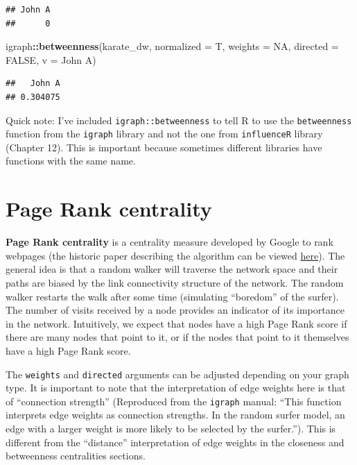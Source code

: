 \documentclass[
]{book}
\newenvironment{Shaded}{\begin{snugshade}}{\end{snugshade}}
\newcommand{\AttributeTok}[1]{\textcolor[rgb]{0.13,0.29,0.53}{#1}}
\newcommand{\ConstantTok}[1]{\textcolor[rgb]{0.56,0.35,0.01}{#1}}
\newcommand{\FunctionTok}[1]{\textcolor[rgb]{0.13,0.29,0.53}{\textbf{#1}}}
\newcommand{\NormalTok}[1]{#1}
\newcommand{\SpecialCharTok}[1]{\textcolor[rgb]{0.81,0.36,0.00}{\textbf{#1}}}
\newcommand{\StringTok}[1]{\textcolor[rgb]{0.31,0.60,0.02}{#1}}
\begin{document}
\begin{verbatim}
## John A 
##      0
\end{verbatim}

\begin{Shaded}
\begin{Highlighting}[]
\NormalTok{igraph}\SpecialCharTok{::}\FunctionTok{betweenness}\NormalTok{(karate\_dw, }\AttributeTok{normalized =}\NormalTok{ T, }\AttributeTok{weights =} \ConstantTok{NA}\NormalTok{, }\AttributeTok{directed =} \ConstantTok{FALSE}\NormalTok{, }\AttributeTok{v =} \StringTok{\textquotesingle{}John A\textquotesingle{}}\NormalTok{)}
\end{Highlighting}
\end{Shaded}

\begin{verbatim}
##   John A 
## 0.304075
\end{verbatim}

Quick note: I've included \texttt{igraph::betweenness} to tell R to use the \texttt{betweenness} function from the \texttt{igraph} library and not the one from \texttt{influenceR} library (Chapter 12). This is important because sometimes different libraries have functions with the same name.

\section{Page Rank centrality}\label{page-rank-centrality}

\textbf{Page Rank centrality} is a centrality measure developed by Google to rank webpages (the historic paper describing the algorithm can be viewed \href{http://infolab.stanford.edu/~backrub/google.html}{here}). The general idea is that a random walker will traverse the network space and their paths are biased by the link connectivity structure of the network. The random walker restarts the walk after some time (simulating ``boredom'' of the surfer). The number of visits received by a node provides an indicator of its importance in the network. Intuitively, we expect that nodes have a high Page Rank score if there are many nodes that point to it, or if the nodes that point to it themselves have a high Page Rank score.

The \texttt{weights} and \texttt{directed} arguments can be adjusted depending on your graph type. It is important to note that the interpretation of edge weights here is that of ``connection strength'' (Reproduced from the \texttt{igraph} manual: ``This function interprets edge weights as connection strengths. In the random surfer model, an edge with a larger weight is more likely to be selected by the surfer.''). This is different from the ``distance'' interpretation of edge weights in the closeness and betweenness centralities sections.
\end{document}
